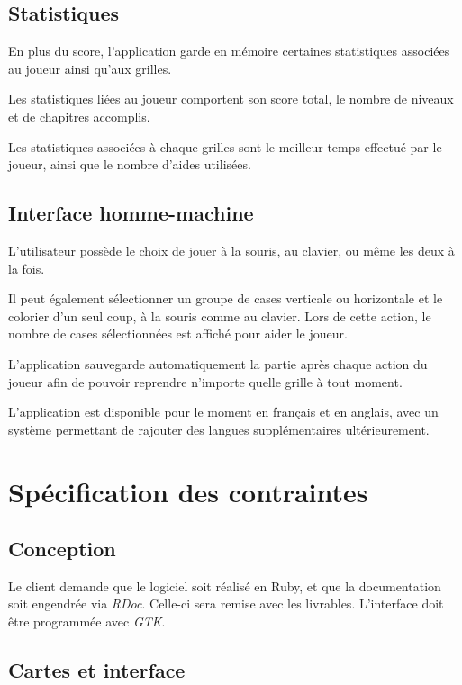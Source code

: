 \documentclass[a4paper, 12pt]{report}
\begin{document}
		\section{Statistiques}
		
			En plus du score, l'application garde en mémoire certaines statistiques associées au joueur ainsi qu'aux grilles. 
			
			Les statistiques liées au joueur comportent son score total, le nombre de niveaux et de chapitres accomplis. 
		
			Les statistiques associées à chaque grilles sont le meilleur temps effectué par le joueur, ainsi que le nombre d'aides utilisées.

		\section{Interface homme-machine}
		
			L'utilisateur possède le choix de jouer à la souris, au clavier, ou même les deux à la fois.
			
			Il peut également sélectionner un groupe de cases verticale ou horizontale et le colorier d'un seul coup, à la souris comme au clavier. Lors de cette action, le nombre de cases sélectionnées est affiché pour aider le joueur. 
			
			L'application sauvegarde automatiquement la partie après chaque action du joueur afin de pouvoir reprendre n'importe quelle grille à tout moment.
			
			L'application est disponible pour le moment en français et en anglais, avec un système permettant de rajouter des langues supplémentaires ultérieurement.


\chapter{Spécification des contraintes}
\vspace*{0.5cm}
	\section{Conception}
	
		Le client demande que le logiciel soit réalisé en Ruby, et que la documentation soit engendrée via \textit{RDoc}. Celle-ci sera remise avec les livrables. L'interface doit être programmée avec \textit{GTK}.
		
	\section{Cartes et interface}
	
\end{document}
